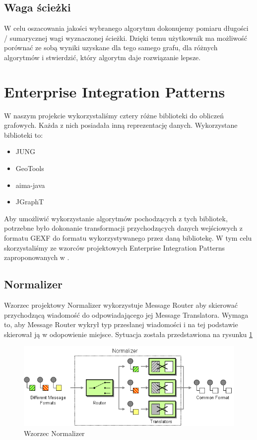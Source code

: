 \subsection{Waga ścieżki}

W celu oszacowania jakości wybranego algorytmu dokonujemy pomiaru długości / sumarycznej wagi wyznaczonej ścieżki.
Dzięki temu użytkownik ma możliwość porównać ze sobą wyniki uzyskane dla tego samego grafu, dla różnych algorytmów i stwierdzić, który algorytm daje rozwiązanie lepsze.

\section{Enterprise Integration Patterns}
W naszym projekcie wykorzystaliśmy cztery różne biblioteki do obliczeń grafowych. 
Każda z nich posiadała inną reprezentację danych. Wykorzystane biblioteki to:

\begin{itemize}
 \item JUNG
 \item GeoTools
 \item aima-java
 \item JGraphT
\end{itemize}

Aby umożliwić wykorzystanie algorytmów pochodzących z tych bibliotek, potrzebne było dokonanie transformacji przychodzących danych wejściowych z
formatu GEXF do formatu wykorzystywanego przez daną bibliotekę.
W tym celu skorzystaliśmy ze wzorców projektowych Enterprise Integration Patterns zaproponowanych w \cite{hohpe2004enterprise}.

\subsection{Normalizer}
Wzorzec projektowy Normalizer wykorzystuje Message Router aby skierować przychodzącą wiadomość do odpowiadającego jej Message Translatora.
Wymaga to, aby Message Router wykrył typ przesłanej wiadomości i na tej podstawie skierował ją w odopowienie miejsce.
Sytuacja została przedstawiona na rysunku \ref{fig:normalizer}

\begin{figure}[!h]
 \centering
 \includegraphics[width=1.0\textwidth]{eip/Normalizer}
 \caption{Wzorzec Normalizer}
 \label{fig:normalizer}
\end{figure}

